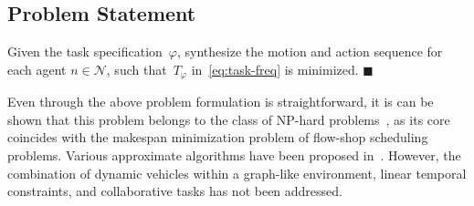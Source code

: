 \subsection{Problem Statement}\label{subsec:problem-statement}

\begin{problem}\label{prob:formulation}
Given the task specification~$\varphi$,
synthesize the motion and action
sequence for each agent $n\in \mathcal{N}$,
such that~$T_{\varphi}$ in~\eqref{eq:task-freq} is minimized.
\hfill $\blacksquare$
\end{problem}
Even through the above problem formulation is straightforward,
it is can be shown that this problem belongs to the class of NP-hard
problems~\citep{hochba1997approximation},
as its core coincides with the makespan minimization problem
of flow-shop scheduling problems.
Various approximate algorithms have been proposed in~\citep{khamis2015multi}.
However,
the combination of dynamic vehicles within a graph-like environment,
linear temporal constraints,
and collaborative tasks has not been addressed.
